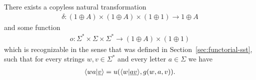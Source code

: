 \begin{lemma}\label{lem:compute-next-configuration}
    There exists a  copyless natural transformation 
    \begin{align*}
    \delta : (1 \oplus A) \times (1 \oplus A) \times (1 \oplus 1) \to 1 \oplus A
    \end{align*} 
    and some function 
    \begin{align*}
    o : \Sigma^* \times \Sigma \times \Sigma^*  \to  (1 \oplus A) \times (1 \oplus 1)
    \end{align*}
    which is recognizable in the sense that was defined in Section~\ref{sec:functorial-sst}, such that  for every strings $w,v \in \Sigma^*$ and every letter $a \in \Sigma$ we have 
    \begin{align*}
    \langle wa|\underline v \rangle  = u( \langle w|\underline{av} \rangle, g(w,a,v)).
    \end{align*}
\end{lemma}
